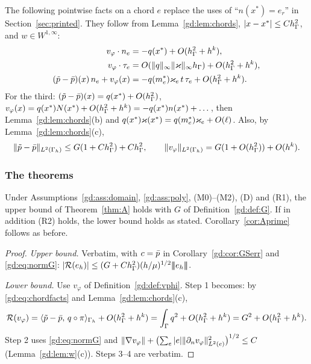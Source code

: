 The following pointwise facts on a chord $e$ replace the uses of ``$n(x^\ast)=e_r$'' in Section~\ref{sec:printed}. They follow from Lemma~\ref{gd:lem:chords}, $|x-x^\ast|\le Ch_\Gamma^2$, and $w\in W^{1,\infty}$:
\begin{equation}\label{gd:eq:chordfacts}
\begin{aligned}
v_\varphi\cdot n_e&=-q(x^\ast)+O(h_\Gamma^2+h^k),\\
v_\varphi\cdot\tau_e&=O(\lVert q\rVert_\infty\lVert \varkappa\rVert_\infty h_\Gamma)+O(h_\Gamma^2+h^k),\\
(\tilde p-\bar p)(x)\,n_e+v_\varphi(x)&=-q(m_e^\ast)\varkappa_e\,t\,\tau_e+O(h_\Gamma^2+h^k).
\end{aligned}
\end{equation}
For the third: $(\tilde p-\bar p)(x)=q(x^\ast)+O(h_\Gamma^2)$, $v_\varphi(x)=q(x^\ast)N(x^\ast)+O(h_\Gamma^2+h^k)=-q(x^\ast)n(x^\ast)+\dots$, then Lemma~\ref{gd:lem:chords}(b) and $q(x^\ast)\varkappa(x^\ast)=q(m_e^\ast)\varkappa_e+O(\ell)$. Also, by Lemma~\ref{gd:lem:chords}(c),
\begin{equation}\label{gd:eq:normG}
\lVert \tilde p-\bar p\rVert_{L^2(\Gamma_h)}\le G(1+Ch_\Gamma^2)+Ch_\Gamma^2,\qquad\lVert v_\varphi\rVert_{L^2(\Gamma_h)}=G(1+O(h_\Gamma^2))+O(h^k).
\end{equation}

\subsubsection{The theorems}
\begin{theorem}\label{gd:thm:A}
Under Assumptions~\ref{gd:ass:domain}, \ref{gd:ass:poly}, (M0)--(M2), (D) and (R1), the upper bound of Theorem~\ref{thm:A} holds with $G$ of Definition~\ref{gd:def:G}. If in addition (R2) holds, the lower bound holds as stated. Corollary~\ref{cor:Aprime} follows as before.
\end{theorem}

\begin{proof}
\emph{Upper bound.} Verbatim, with $c=\bar p$ in Corollary~\ref{gd:cor:GSerr} and \eqref{gd:eq:normG}: $|\mathcal R(e_h)|\le(G+Ch_\Gamma^2)(h/\mu)^{1/2}|\!|\!|e_h|\!|\!|$.

\emph{Lower bound.} Use $v_\varphi$ of Definition~\ref{gd:def:vphi}. Step 1 becomes: by \eqref{gd:eq:chordfacts} and Lemma~\ref{gd:lem:chords}(c),
\[
\mathcal R(v_\varphi)=\langle \tilde p-\bar p,\, q\circ\pi\rangle_{\Gamma_h}+O(h_\Gamma^2+h^k)=\int_\Gamma q^2+O(h_\Gamma^2+h^k)=G^2+O(h_\Gamma^2+h^k).
\]
Step 2 uses \eqref{gd:eq:normG} and $\lVert \nabla v_\varphi\rVert+\bigl(\sum_e|e|\lVert \partial_n v_\varphi\rVert_{L^2(e)}^2\bigr)^{1/2}\le C$ (Lemma~\ref{gd:lem:w}(c)). Steps 3--4 are verbatim.
\end{proof}

